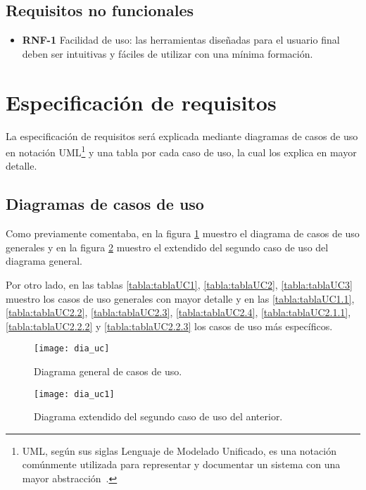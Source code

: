 \subsection{Requisitos no funcionales}

\begin{itemize}
	\item \textbf{RNF-1} Facilidad de uso: las herramientas diseñadas para el usuario final deben ser intuitivas y fáciles de utilizar con una mínima formación.
\end{itemize}

\section{Especificación de requisitos}

La especificación de requisitos será explicada mediante diagramas de casos de uso en notación UML\footnote{UML, según sus siglas Lenguaje de Modelado Unificado, es una notación comúnmente utilizada para representar y documentar un sistema con una mayor abstracción~\cite{wiki:uml}.} y una tabla por cada caso de uso, la cual los explica en mayor detalle.

\subsection{Diagramas de casos de uso}

Como previamente comentaba, en la figura \ref{fig:B.1} muestro el diagrama de casos de uso generales y en la figura \ref{fig:B.2} muestro el extendido del segundo caso de uso del diagrama general.

Por otro lado, en las tablas \ref{tabla:tablaUC1}, \ref{tabla:tablaUC2}, \ref{tabla:tablaUC3} muestro los casos de uso generales con mayor detalle y en las \ref{tabla:tablaUC1.1}, \ref{tabla:tablaUC2.2}, \ref{tabla:tablaUC2.3}, \ref{tabla:tablaUC2.4}, \ref{tabla:tablaUC2.1.1}, \ref{tabla:tablaUC2.2.2} y \ref{tabla:tablaUC2.2.3} los casos de uso más específicos.

\begin{figure}
\centering
\texttt{[image: dia\_uc]}
\caption{Diagrama general de casos de uso.}
\label{fig:B.1}
\end{figure}

\begin{figure}
\centering
\texttt{[image: dia\_uc1]}
\caption[Diagrama extendido]{Diagrama extendido del segundo caso de uso del anterior.}
\label{fig:B.2}
\end{figure}




